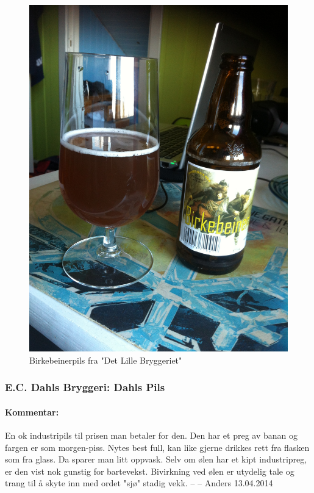 \documentclass[12pt,a4paper,oneside,norsk]{article}
\begin{document}
\begin{figure} [H]
\centering
\includegraphics[scale=0.1, angle=270]{Bilder/Ol/Birkebeiner.jpg}
\caption{Birkebeinerpils fra "Det Lille Bryggeriet"}
\end{figure}

\newpage
\subsubsection{E.C. Dahls Bryggeri: Dahls Pils}
\paragraph{Kommentar:}En ok industripils til prisen man betaler for den. Den har et preg av banan og fargen er som morgen-piss. Nytes best full, kan like gjerne drikkes rett fra flasken som fra glass. Da sparer man litt oppvask. Selv om ølen har et kipt industripreg, er den vist nok gunstig for bartevekst. Bivirkning ved ølen er utydelig tale og trang til å skyte inn med ordet "sjø" stadig vekk.
\newline
-- -- Anders 13.04.2014
\end{document}
